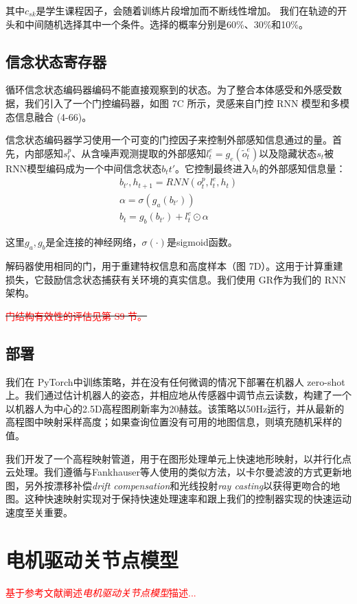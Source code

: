   其中$c_{sk}$是学生课程因子，会随着训练片段增加而不断线性增加。
  我们在轨迹的开头和中间随机选择其中一个条件。选择的概率分别是60\%、30\%和10\%。
  
  
  \subsection[信念状态寄存器]{信念状态寄存器}
  
  循环信念状态编码器编码不能直接观察到的状态。为了整合本体感受和外感受数据，我们引入了一个门控编码器，如图 7C 所示，灵感来自门控 RNN 模型\cite[p]{Cho_van_Merrienboer_Gulcehre_Bahdanau_Bougares_Schwenk_Bengio_2014, Hochreiter_Schmidhuber_1997}和多模态信息融合 (4-66)。
  
  信念状态编码器学习使用一个可变的门控因子来控制外部感知信息通过的量。首先，内部感知$s_t^p$、从含噪声观测提取的外部感知$l_t^e=g_e(\widetilde o_t^e)$以及隐藏状态$s_t$被RNN模型编码成为一个中间信念状态$b_t{t'}$。它控制最终进入$b_t$的外部感知信息量：
  \begin{align}
    b_{t'},h_{t+1}=RNN(o_t^p,l_t^e,h_t)\\
    \alpha = \sigma (g_a(b_{t'}))\\
    b_t = g_b(b_{t'})+l_t^e \odot \alpha
  \end{align}
  
  这里$g_a,g_b$是全连接的神经网络，$\sigma(\cdot)$是sigmoid函数。
  
  解码器使用相同的门，用于重建特权信息和高度样本（图 7D）。这用于计算重建损失，它鼓励信念状态捕获有关环境的真实信息。我们使用 GR\cite[p]{Cho_van_Merrienboer_Gulcehre_Bahdanau_Bougares_Schwenk_Bengio_2014}作为我们的 RNN 架构。
  
  \sout{\textcolor{red}{\small 门结构有效性的评估见第 S9 节。}}
  
  \subsection[部署]{部署}
  
  我们在 PyTorch\cite[p]{Paszke_Gross_Massa_Lerer_Bradbury_Chanan_Killeen_Lin_Gimelshein_Antiga_et_al_2019}中训练策略，并在没有任何微调的情况下部署在机器人 zero-shot上。我们通过估计机器人的姿态，并相应地从传感器中调节点云读数，构建了一个以机器人为中心的2.5D高程图刷新率为20赫兹。该策略以50Hz运行，并从最新的高程图中映射采样高度；如果查询位置没有可用的地图信息，则填充随机采样的值。
  
  我们开发了一个高程映射管道，用于在图形处理单元上快速地形映射，以并行化点云处理。我们遵循与Fankhauser等人\cite[p]{Fankhauser_Bloesch_Hutter_2018}使用的类似方法，以卡尔曼滤波的方式更新地图，另外按漂移补偿\emph{drift compensation}和光线投射\emph{ray casting}以获得更吻合的地图。这种快速映射实现对于保持快速处理速率和跟上我们的控制器实现的快速运动速度至关重要。
  
  


\section[电机驱动关节点模型]{电机驱动关节点模型\cite[p4]{Gehring_Coros_Hutter_Bellicoso_Heijnen_Diethelm_Bloesch_Fankhauser_Hwangbo_Hoepflinger_et_al_2016}}

\textcolor{red}{\small
基于参考文献阐述\emph{电机驱动关节点模型}描述...
}
